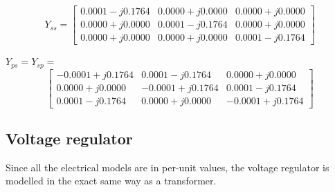 \documentclass[nols,a4paper,twoside,symmetric,notoc,fleqn]{tufte-book}
\begin{document}
$$
Y_{ss} =\left[ \begin{array}{ccc}
0.0001 - j0.1764 & 0.0000 + j0.0000 & 0.0000 + j0.0000\\
0.0000 + j0.0000 & 0.0001 - j0.1764 & 0.0000 + j0.0000\\
0.0000 + j0.0000 & 0.0000 + j0.0000 & 0.0001 - j0.1764
\end{array} \right]
$$



$Y_{ps} = Y_{sp} =$
$$
\left[ \begin{array}{ccc}
-0.0001 + j0.1764 & 0.0001 - j0.1764 & 0.0000 + j0.0000\\
0.0000 + j0.0000 & -0.0001 + j0.1764 & 0.0001 - j0.1764\\
0.0001 - j0.1764 & 0.0000 + j0.0000 & -0.0001 + j0.1764
\end{array} \right]
$$





\subsection{Voltage regulator}

Since all the electrical models are in per-unit values, the voltage regulator is modelled in the exact same way as a transformer.
\end{document}
